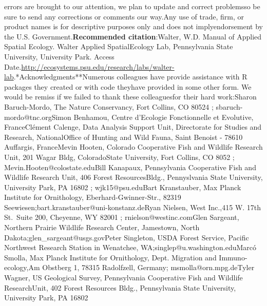 \documentclass[
  letterpaper,
  DIV=11,
  numbers=noendperiod]{scrreprt}
\begin{document}
{{{errors are brought to our attention, we plan to update and correct
problemsso be sure to send any corrections or comments our way.Any use
of trade, firm, or product names is for descriptive purposes only and
does not implyendorsement by the U.S. Government.\textbf{Recommended
citation}:Walter, W.D. Manual of Applied Spatial Ecology. Walter Applied
SpatialEcology Lab, Pennsylvania State University, University Park.
Access
Date.\url{http://ecosystems.psu.edu/research/labs/walter-lab}.\newpage**Acknowledgments**Numerous
colleagues have provide assistance with R packages they created or with
code theyhave provided in some other form. We would be remiss if we
failed to thank these colleaguesfor their hard work:Sharon Baruch-Mordo,
The Nature Conservancy, Fort Collins, CO 80524 ;
sbaruch-mordo@tnc.orgSimon Benhamou, Centre d'Ecologie Fonctionnelle et
Evolutive, FranceClément Calenge, Data Analysis Support Unit,
Directorate for Studies and Research, NationalOffice of Hunting and Wild
Fauna, Saint Benoist - 78610 Auffargis, FranceMevin Hooten, Colorado
Cooperative Fish and Wildlife Research Unit, 201 Wagar Bldg,
ColoradoState University, Fort Collins, CO 8052 ;
Mevin.Hooten@colostate.eduBill Kanapaux, Pennsylvania Cooperative Fish
and Wildlife Research Unit, 406 Forest ResourcesBldg., Pennyslvania
State University, University Park, PA 16802 ; wjk15@psu.eduBart
Kranstauber, Max Planck Institute for Ornithology,
Eberhard-Gwinner-Str., 82319
Seewiesen;bart.kranstauber@uni-konstanz.deRyan Nielsen, West Inc.,415 W.
17th St.~Suite 200, Cheyenne, WY 82001 ; rnielson@westinc.comGlen
Sargeant, Northern Prairie Wildlife Research Center, Jamestown, North
Dakota;glen\_sargeant@usgs.govPeter Singleton, USDA Forest Service,
Pacific Northwest Research Station in Wenatchee,
WA;singlep@u.washington.eduMarcó Smolla, Max Planck Institute for
Ornithology, Dept. Migration and Immuno-ecology,Am Obstberg 1, 78315
Radolfzell, Germany; msmolla@orn.mpg.deTyler Wagner, US Geological
Survey, Pennsylvania Cooperative Fish and Wildlife ResearchUnit, 402
Forest Resources Bldg., Pennsylvania State University, University Park,
PA 16802
}}}
\end{document}
